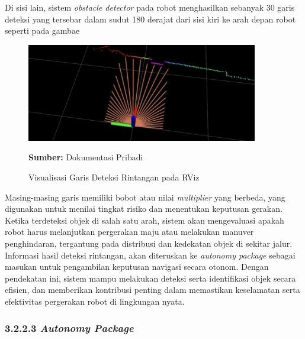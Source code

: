 Di sisi lain, sistem \emph{obstacle detector} pada robot menghasilkan sebanyak 30 garis deteksi yang tersebar dalam sudut 180 derajat dari sisi kiri ke arah depan robot seperti pada gambae 
\begin{figure}[H]
  \centering
  \includegraphics[width=0.9\textwidth]{gambar/bab3/obstacle_avoidance.png}
  \caption{Visualisasi Garis Deteksi Rintangan pada RViz}
  \label{fig:obstacle-avoidance}
  \footnotesize{\textbf{Sumber:} Dokumentasi Pribadi}
\end{figure}




Masing-masing garis memiliki bobot atau nilai \emph{multiplier} yang berbeda, yang digunakan untuk menilai tingkat risiko dan menentukan keputusan gerakan. Ketika terdeteksi objek di salah satu arah, sistem akan mengevaluasi apakah robot harus melanjutkan pergerakan maju atau melakukan manuver penghindaran, tergantung pada distribusi dan kedekatan objek di sekitar jalur. Informasi hasil  deteksi rintangan, akan diteruskan ke \emph{autonomy package} sebagai masukan untuk pengambilan keputusan navigasi secara otonom. Dengan pendekatan ini, sistem mampu melakukan deteksi serta identifikasi objek secara efisien, dan memberikan kontribusi penting dalam memastikan keselamatan serta efektivitas pergerakan robot di lingkungan nyata.

\subsubsection{3.2.2.3 \emph{Autonomy Package}}


